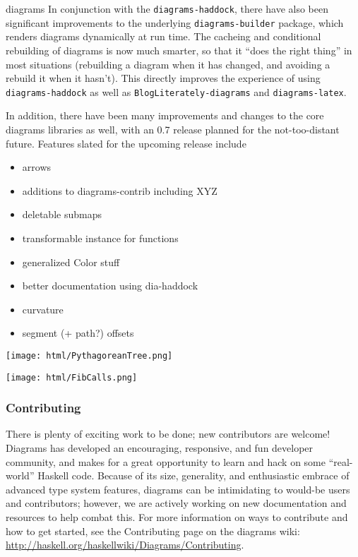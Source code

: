 \begin{hcarentry}[updated]{diagrams}
In conjunction with the \texttt{diagrams-haddock}, there have also
been significant improvements to the underlying
\texttt{diagrams-builder} package, which renders diagrams dynamically
at run time.  The cacheing and conditional rebuilding of diagrams is
now much smarter, so that it ``does the right thing'' in most
situations (rebuilding a diagram when it has changed, and avoiding
a rebuild it when it hasn't).  This directly improves the experience
of using \texttt{diagrams-haddock} as well as
\texttt{BlogLiterately-diagrams} and \texttt{diagrams-latex}.

In addition, there have been many improvements and changes to the core
diagrams libraries as well, with an 0.7 release planned for the
not-too-distant future. Features slated for the upcoming release
include
\begin{itemize}
\item arrows
\item additions to diagrams-contrib including XYZ
\item deletable submaps
\item transformable instance for functions
\item generalized Color stuff
\item better documentation using dia-haddock
\item curvature
\item segment (+ path?) offsets
\end{itemize}

\begin{center}
\texttt{[image: html/PythagoreanTree.png]}
\end{center}


\begin{center}
\texttt{[image: html/FibCalls.png]}
\end{center}

\subsubsection*{Contributing}

There is plenty of exciting work to be done; new contributors are
welcome!  Diagrams has developed an encouraging, responsive, and fun
developer community, and makes for a great opportunity to learn and
hack on some ``real-world'' Haskell code.  Because of its size,
generality, and enthusiastic embrace of advanced type system features,
diagrams can be intimidating to would-be users and contributors;
however, we are actively working on new documentation and resources to
help combat this.  For more information on ways to contribute and how
to get started, see the Contributing page on the diagrams wiki:
\url{http://haskell.org/haskellwiki/Diagrams/Contributing}.


\end{hcarentry}
